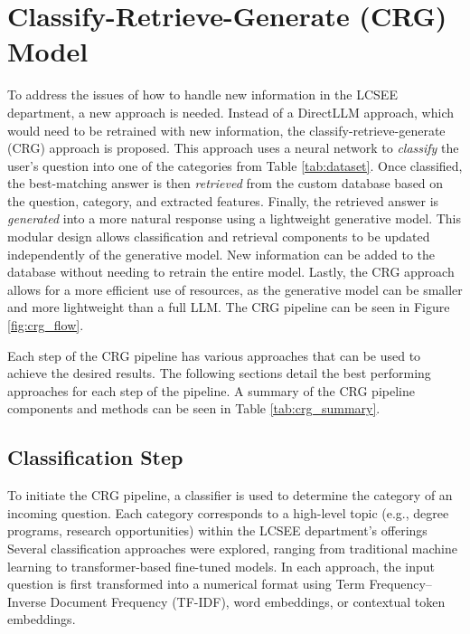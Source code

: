 \documentclass[conference]{IEEEtran}
\begin{document}
\section{Classify-Retrieve-Generate (CRG) Model}
To address the issues of how to handle new information in the LCSEE department, a new approach is needed. 
Instead of a DirectLLM approach, which would need to be retrained with new information, the classify-retrieve-generate (CRG) approach is proposed. 
This approach uses a neural network to \textit{classify} the user's question into one of the categories from Table \ref{tab:dataset}.
Once classified, the best-matching answer is then \textit{retrieved} from the custom database based on the question, category, and extracted features.
Finally, the retrieved answer is \textit{generated} into a more natural response using a lightweight generative model.
This modular design allows classification and retrieval components to be updated independently of the generative model.
New information can be added to the database without needing to retrain the entire model.
Lastly, the CRG approach allows for a more efficient use of resources, as the generative model can be smaller and more lightweight than a full LLM.
The CRG pipeline can be seen in Figure \ref{fig:crg_flow}.

Each step of the CRG pipeline has various approaches that can be used to achieve the desired results.
The following sections detail the best performing approaches for each step of the pipeline.
A summary of the CRG pipeline components and methods can be seen in Table \ref{tab:crg_summary}.

\subsection{Classification Step}
To initiate the CRG pipeline, a classifier is used to determine the category of an incoming question. 
Each category corresponds to a high-level topic (e.g., degree programs, research opportunities) within the LCSEE department's offerings
Several classification approaches were explored, ranging from traditional machine learning to transformer-based fine-tuned models. 
In each approach, the input question is first transformed into a numerical format using Term Frequency–Inverse Document Frequency (TF-IDF), word embeddings, or contextual token embeddings.
\end{document}
